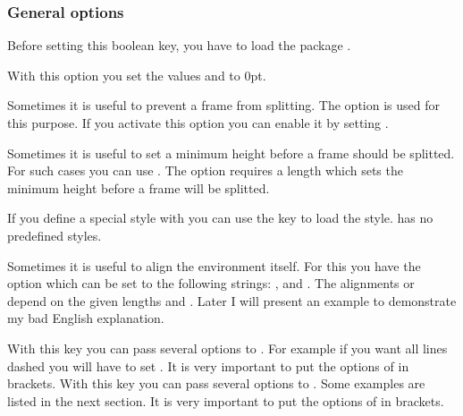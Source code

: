 \documentclass[parskip=false,english,11pt]{ltxmdf}
\begin{document}
\subsubsection{General options}\label{genopt}

 Before setting this boolean key, you have to load the package . 

                                 With this option you set the values 
                                 and\newline {} to 0\;pt.
                                 
 Sometimes it is useful to prevent a frame from splitting.  The  option is used for this purpose. If you activate this option you can enable it by setting .


 Sometimes it is useful to set a minimum height before a frame should be splitted. For such cases you can use . The option requires a length which sets the minimum height before a frame will be splitted.

 If you define a special style with  you can use the key  to load the style. \mdname has no predefined styles.



 Sometimes it is useful to align the environment itself. For this you have the option  which can be set to the following strings: ,  and . The alignments  or  depend on the given lengths  and . Later I will present an example to demonstrate my bad English explanation.

 With this key you can pass several options to . For example 
                                        if you want all lines dashed you will have to set 
                                        . It is very important
                                        to put the options of  in brackets.
                                        \limitation[PSTricks]
 With this key you can pass several options to . Some examples are listed in the next section. It is very important
                                        to put the options of  in brackets.
                                        \limitation
                                        
\end{document}
